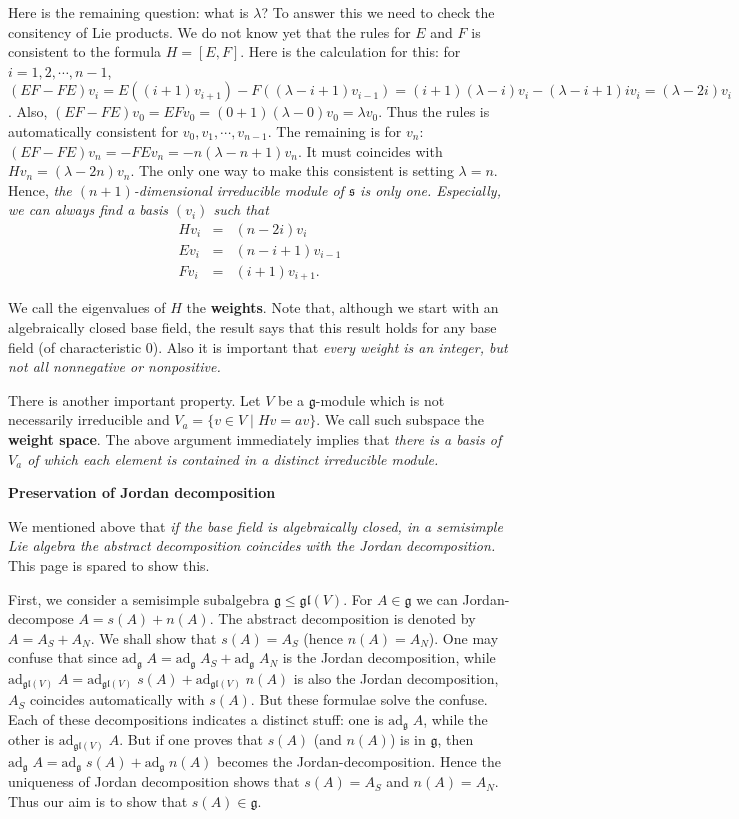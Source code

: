 \documentclass{article}
\newcommand{\SBar}{\;|\;}
\newcommand{\lie}[1]{\mathfrak{#1}}
\newcommand{\adu}[2]{\mathrm{ad}_{#1}\; #2}
\begin{document}
Here is the remaining question: what is $\lambda$?
To answer this we need to check the consitency of Lie products.
We do not know yet that the rules for $E$ and $F$ is consistent to the formula $H = [E, F]$.
Here is the calculation for this: for $i = 1, 2, \cdots, n - 1$, $(EF - FE)v_i = E((i + 1) v_{i + 1}) - F((\lambda - i + 1) v_{i - 1}) = (i + 1)(\lambda - i) v_i - (\lambda - i + 1) iv_i = (\lambda - 2i) v_i$.
Also, $(EF - FE)v_0 = EFv_0 = (0 + 1)(\lambda - 0) v_0 = \lambda v_0$.
Thus the rules is automatically consistent for $v_0, v_1, \cdots, v_{n - 1}$.
The remaining is for $v_n$: $(EF - FE)v_n = -FEv_n = -n(\lambda - n + 1) v_n$.
It must coincides with $Hv_n = (\lambda - 2n) v_n$.
The only one way to make this consistent is setting $\lambda = n$.
Hence, \textit{the $(n + 1)$-dimensional irreducible module of $\lie{s}$ is only one.
Especially, we can always find a basis $(v_i)$ such that }
\begin{eqnarray*}
  Hv_i &=& (n - 2i) v_i \\
  Ev_i &=& (n - i + 1) v_{i - 1} \\
  Fv_i &=& (i + 1) v_{i + 1}.
\end{eqnarray*}

We call the eigenvalues of $H$ the \textbf{weights}.
Note that, although we start with an algebraically closed base field, the result says that this result holds for any base field (of characteristic 0).
Also it is important that \textit{every weight is an integer, but not all nonnegative or nonpositive.}

There is another important property.
Let $V$ be a $\lie{g}$-module which is not necessarily irreducible and $V_a = \{v \in V \SBar Hv = av\}$.
We call such subspace the \textbf{weight space}.
The above argument immediately implies that \textit{there is a basis of $V_a$ of which each element is contained in a distinct irreducible module.}

\newpage

\textbf{Preservation of Jordan decomposition}

We mentioned above that \textit{if the base field is algebraically closed, in a semisimple Lie algebra the abstract decomposition coincides with the Jordan decomposition.}
This page is spared to show this.

First, we consider a semisimple subalgebra $\lie{g} \le \lie{gl}(V)$.
For $A \in \lie{g}$ we can Jordan-decompose $A = s(A) + n(A)$.
The abstract decomposition is denoted by $A = A_S + A_N$.
We shall show that $s(A) = A_S$ (hence $n(A) = A_N$).
One may confuse that since $\adu{\lie{g}}{A} = \adu{\lie{g}}{A_S} + \adu{\lie{g}}{A_N}$ is the Jordan decomposition, while $\adu{\lie{gl}(V)}{A} = \adu{\lie{gl}(V)}{s(A)} + \adu{\lie{gl}(V)}{n(A)}$ is also the Jordan decomposition, $A_S$ coincides automatically with $s(A)$.
But these formulae solve the confuse.
Each of these decompositions indicates a distinct stuff: one is $\adu{\lie{g}}{A}$, while the other is $\adu{\lie{gl}(V)}{A}$.
But if one proves that $s(A)$ (and $n(A)$) is in $\lie{g}$, then $\adu{\lie{g}}{A} = \adu{\lie{g}}{s(A)} + \adu{\lie{g}}{n(A)}$ becomes the Jordan-decomposition.
Hence the uniqueness of Jordan decomposition shows that $s(A) = A_S$ and $n(A) = A_N$.
Thus our aim is to show that $s(A) \in \lie{g}$.
\end{document}
